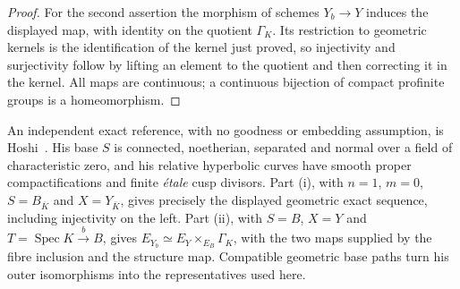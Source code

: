 \begin{proof}
For the second assertion the morphism of schemes $Y_b\to Y$ induces the displayed map, with identity on the quotient $\Gamma_K$. Its restriction to geometric kernels is the identification of the kernel just proved, so injectivity and surjectivity follow by lifting an element to the quotient and then correcting it in the kernel. All maps are continuous; a continuous bijection of compact profinite groups is a homeomorphism.
\end{proof}

An independent exact reference, with no goodness or embedding assumption,
is Hoshi~\cite[Proposition 2.4(i),(ii), pp.~169--172]{B_Hoshi2014}.
His base $S$ is connected, noetherian, separated and normal over a field
of characteristic zero, and his relative hyperbolic curves have smooth
proper compactifications and finite \emph{\'etale} cusp divisors.
Part (i), with $n=1$, $m=0$, $S=B_{\overline K}$ and
$X=Y_{\overline K}$, gives precisely the displayed geometric exact
sequence, including injectivity on the left. Part (ii), with
$S=B$, $X=Y$ and $T=\operatorname{Spec}K\xrightarrow{b}B$, gives
$E_{Y_b}\simeq E_Y\times_{E_B}\Gamma_K$, with the two maps supplied
by the fibre inclusion and the structure map. Compatible geometric
base paths turn his outer isomorphisms into the representatives used
here.

